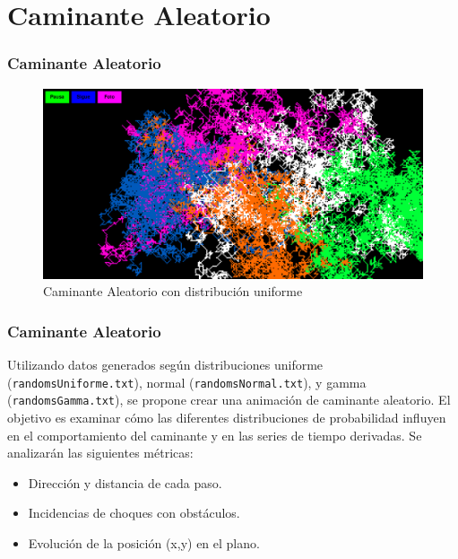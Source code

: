 
\section{Caminante Aleatorio}


\begin{frame}
	\frametitle{Caminante Aleatorio}
	\begin{figure}
		\centering
		\includegraphics[width=\textwidth]{walkerUniforme} %
		\caption{Caminante Aleatorio con distribución uniforme}
	\end{figure}
	
	
\end{frame}

\begin{frame}
	\frametitle{Caminante Aleatorio}
	Utilizando datos generados según distribuciones uniforme (\texttt{randomsUniforme.txt}), normal (\texttt{randomsNormal.txt}), y gamma (\texttt{randomsGamma.txt}), se propone crear una animación de caminante aleatorio. El objetivo es examinar cómo las diferentes distribuciones de probabilidad influyen en el comportamiento del caminante y en las series de tiempo derivadas. Se analizarán las siguientes métricas:
	
	\vspace{5mm}
	\begin{itemize}
		\item Dirección y distancia de cada paso.
		\item Incidencias de choques con obstáculos.
		\item Evolución de la posición (x,y) en el plano.
	\end{itemize}
	
\end{frame}


